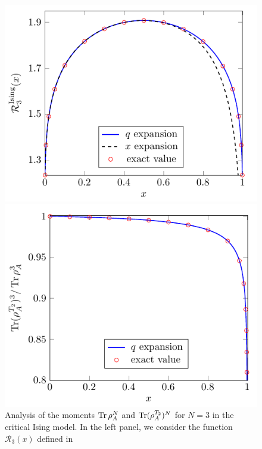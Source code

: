 \documentclass[a4paper,11pt]{article}
\def\Tr{\mathop{\mbox{\normalfont Tr}}\nolimits}
\begin{document}
\begin{figure}[t]
 \begin{minipage}{0.5\linewidth}
 \centering 
 \includegraphics[width=\textwidth]{renyi_entropy_3_ising.pdf}
\end{minipage}
 \begin{minipage}{0.5\linewidth}
 \centering 
 \includegraphics[width=\textwidth]{quotient_negativity_entropy_3_ising.pdf}
\end{minipage}
\caption{Analysis of the moments $\Tr\rho_A^N$ and $\Tr(\rho_A^{T_2})^N$ for $N=3$ in the 
critical Ising model. In the left panel, we consider the function $\mathcal{R}_3(x)$ defined in
}
\end{figure}
\end{document}
